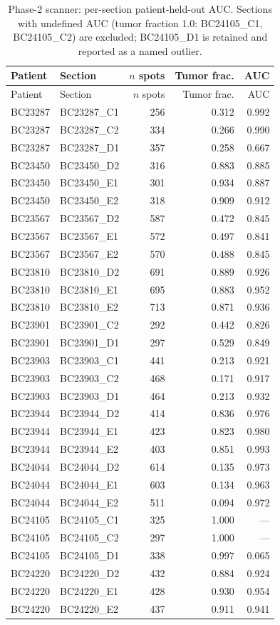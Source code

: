 \begin{longtable}{llrrr}
\caption{Phase-2 scanner: per-section patient-held-out AUC. Sections with undefined AUC (tumor fraction 1.0: BC24105\_C1, BC24105\_C2) are excluded; BC24105\_D1 is retained and reported as a named outlier.}\label{tab:scannersec} \\
\toprule Patient & Section & $n$ spots & Tumor frac. & AUC \\
\midrule\endfirsthead
\toprule Patient & Section & $n$ spots & Tumor frac. & AUC \\
\midrule\endhead
BC23287 & BC23287\_C1 & 256 & 0.312 & 0.992 \\
BC23287 & BC23287\_C2 & 334 & 0.266 & 0.990 \\
BC23287 & BC23287\_D1 & 357 & 0.258 & 0.667 \\
BC23450 & BC23450\_D2 & 316 & 0.883 & 0.885 \\
BC23450 & BC23450\_E1 & 301 & 0.934 & 0.887 \\
BC23450 & BC23450\_E2 & 318 & 0.909 & 0.912 \\
BC23567 & BC23567\_D2 & 587 & 0.472 & 0.845 \\
BC23567 & BC23567\_E1 & 572 & 0.497 & 0.841 \\
BC23567 & BC23567\_E2 & 570 & 0.488 & 0.845 \\
BC23810 & BC23810\_D2 & 691 & 0.889 & 0.926 \\
BC23810 & BC23810\_E1 & 695 & 0.883 & 0.952 \\
BC23810 & BC23810\_E2 & 713 & 0.871 & 0.936 \\
BC23901 & BC23901\_C2 & 292 & 0.442 & 0.826 \\
BC23901 & BC23901\_D1 & 297 & 0.529 & 0.849 \\
BC23903 & BC23903\_C1 & 441 & 0.213 & 0.921 \\
BC23903 & BC23903\_C2 & 468 & 0.171 & 0.917 \\
BC23903 & BC23903\_D1 & 464 & 0.213 & 0.932 \\
BC23944 & BC23944\_D2 & 414 & 0.836 & 0.976 \\
BC23944 & BC23944\_E1 & 423 & 0.823 & 0.980 \\
BC23944 & BC23944\_E2 & 403 & 0.851 & 0.993 \\
BC24044 & BC24044\_D2 & 614 & 0.135 & 0.973 \\
BC24044 & BC24044\_E1 & 603 & 0.134 & 0.963 \\
BC24044 & BC24044\_E2 & 511 & 0.094 & 0.972 \\
BC24105 & BC24105\_C1 & 325 & 1.000 & --- \\
BC24105 & BC24105\_C2 & 297 & 1.000 & --- \\
BC24105 & BC24105\_D1 & 338 & 0.997 & 0.065 \\
BC24220 & BC24220\_D2 & 432 & 0.884 & 0.924 \\
BC24220 & BC24220\_E1 & 428 & 0.930 & 0.954 \\
BC24220 & BC24220\_E2 & 437 & 0.911 & 0.941 \\
\bottomrule
\end{longtable}
